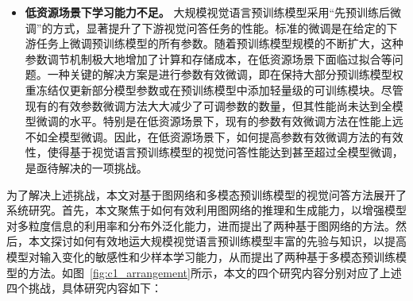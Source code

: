 \begin{itemize}[wide,leftmargin=0pt,itemsep=1pt]
\item\textbf{低资源场景下学习能力不足。} 大规模视觉语言预训练模型采用“先预训练后微调”的方式，显著提升了下游视觉问答任务的性能。标准的微调是在给定的下游任务上微调预训练模型的所有参数。随着预训练模型规模的不断扩大，这种参数调节机制极大地增加了计算和存储成本，在低资源场景下面临过拟合等问题。一种关键的解决方案是进行参数有效微调，即在保持大部分预训练模型权重冻结仅更新部分模型参数或在预训练模型中添加轻量级的可训练模块。尽管现有的有效参数微调方法大大减少了可调参数的数量，但其性能尚未达到全模型微调的水平。特别是在低资源场景下，现有的参数有效微调方法在性能上远不如全模型微调。因此，在低资源场景下，如何提高参数有效微调方法的有效性，使得基于视觉语言预训练模型的视觉问答性能达到甚至超过全模型微调，是亟待解决的一项挑战。

\end{itemize}



为了解决上述挑战，本文对基于图网络和多模态预训练模型的视觉问答方法展开了系统研究。首先，本文聚焦于如何有效利用图网络的推理和生成能力，以增强模型对多粒度信息的利用率和分布外泛化能力，进而提出了两种基于图网络的方法。然后，本文探讨如何有效地运大规模视觉语言预训练模型丰富的先验与知识，以提高模型对输入变化的敏感性和少样本学习能力，从而提出了两种基于多模态预训练模型的方法。如图~\ref{fig:c1_arrangement}所示，本文的四个研究内容分别对应了上述四个挑战，具体研究内容如下：

